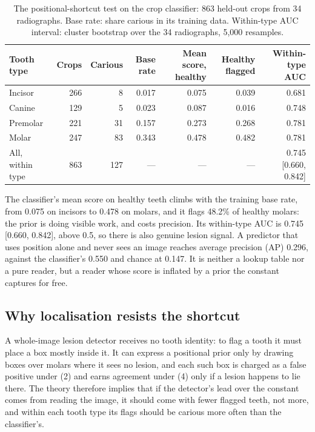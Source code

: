 \documentclass[conference]{IEEEtran}
\begin{document}
\begin{table}[t]
\centering
\caption{The positional-shortcut test on the crop classifier: 863 held-out crops from 34 radiographs. Base rate: share carious in its training data. Within-type AUC interval: cluster bootstrap over the 34 radiographs, 5,000 resamples.}
\label{tab:2}
\footnotesize
\setlength{\tabcolsep}{3pt}
\begin{tabular}{>{\raggedright\arraybackslash}p{5.06cm}rrrrrr}
\toprule
Tooth type & Crops & Carious & Base rate & Mean score, healthy & Healthy flagged & Within-type AUC \\
\midrule
Incisor & 266 & 8 & 0.017 & 0.075 & 0.039 & 0.681 \\
Canine & 129 & 5 & 0.023 & 0.087 & 0.016 & 0.748 \\
Premolar & 221 & 31 & 0.157 & 0.273 & 0.268 & 0.781 \\
Molar & 247 & 83 & 0.343 & 0.478 & 0.482 & 0.781 \\
All, within type & 863 & 127 & — & — & — & 0.745 [0.660, 0.842] \\
\bottomrule
\end{tabular}
\end{table}

The classifier's mean score on healthy teeth climbs with the training base rate, from 0.075 on incisors to 0.478 on molars, and it flags 48.2\% of healthy molars: the prior is doing visible work, and costs precision. Its within-type AUC is 0.745 [0.660, 0.842], above 0.5, so there is also genuine lesion signal. A predictor that uses position alone and never sees an image reaches average precision (AP) 0.296, against the classifier's 0.550 and chance at 0.147. It is neither a lookup table nor a pure reader, but a reader whose score is inflated by a prior the constant captures for free.

\subsection{Why localisation resists the shortcut}

A whole-image lesion detector receives no tooth identity: to flag a tooth it must place a box mostly inside it. It can express a positional prior only by drawing boxes over molars where it sees no lesion, and each such box is charged as a false positive under (2) and earns agreement under (4) only if a lesion happens to lie there. The theory therefore implies that if the detector's lead over the constant comes from reading the image, it should come with fewer flagged teeth, not more, and within each tooth type its flags should be carious more often than the classifier's.
\end{document}
